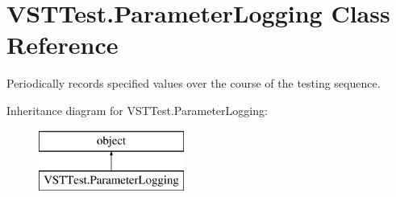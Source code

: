 \hypertarget{class_v_s_t_test_1_1_parameter_logging}{}\section{V\+S\+T\+Test.\+Parameter\+Logging Class Reference}
\label{class_v_s_t_test_1_1_parameter_logging}


Periodically records specified values over the course of the testing sequence.  


Inheritance diagram for V\+S\+T\+Test.\+Parameter\+Logging\+:\begin{figure}[H]
\begin{center}
\leavevmode
\includegraphics[height=2.000000cm]{class_v_s_t_test_1_1_parameter_logging}
\end{center}
\end{figure}
